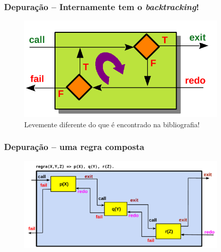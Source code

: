 \begin{frame}[fragile]


\frametitle{Depuração -- Internamente  tem o \textit{backtracking}!}
\begin{figure}[!htb]
\begin{center}
\includegraphics[width=0.90\textwidth, height=0.6\textheight]{figures/trace02.pdf}
\caption{Levemente diferente do que é encontrado na bibliografia!}
\end{center}
\end{figure}

\end{frame}


\begin{frame}[fragile]

\frametitle{Depuração -- uma regra composta}

\begin{figure}[!htb]
\begin{center}
\includegraphics[width=0.90\textwidth, height=0.6\textheight]{figures/trace03.pdf}
\end{center}
\end{figure}

\end{frame}


